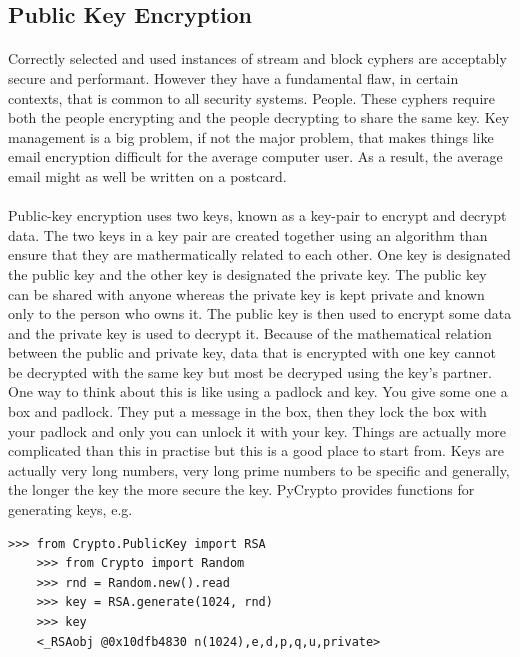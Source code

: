 \documentclass[12pt, a4paper, twoside]{book}
\begin{document}
\subsection{Public Key Encryption}
\paragraph{} Correctly selected and used instances of stream and block cyphers are acceptably secure and performant. However they have a fundamental flaw, in certain contexts, that is common to all security systems. People. These cyphers require both the people encrypting and the people decrypting to share the same key. Key management is a big problem, if not the major problem, that makes things like email encryption difficult for the average computer user. As a result, the average email might as well be written on a postcard.

\paragraph{} Public-key encryption uses two keys, known as a key-pair to encrypt and decrypt data. The two keys in a key pair are created together using an algorithm than ensure that they are mathermatically related to each other. One key is designated the public key and the other key is designated the private key. The public key can be shared with anyone whereas the private key is kept private and known only to the person who owns it. The public key is then used to encrypt some data and the private key is used to decrypt it. Because of the mathematical relation between the public and private key, data that is encrypted with one key cannot be decrypted with the same key but most be decryped using the key's partner. One way to think about this is like using a padlock and key. You give some one a box and padlock. They put a message in the box, then they lock the box with your padlock and only you can unlock it with your key. Things are actually more complicated than this in practise but this is a good place to start from. Keys are actually very long numbers, very long prime numbers to be specific and generally, the longer the key the more secure the key. PyCrypto provides functions for generating keys, e.g.

\begin{lstlisting}[style=DOS]
    >>> from Crypto.PublicKey import RSA
    >>> from Crypto import Random
    >>> rnd = Random.new().read
    >>> key = RSA.generate(1024, rnd)
    >>> key
    <_RSAobj @0x10dfb4830 n(1024),e,d,p,q,u,private>
\end{lstlisting}
\end{document}
